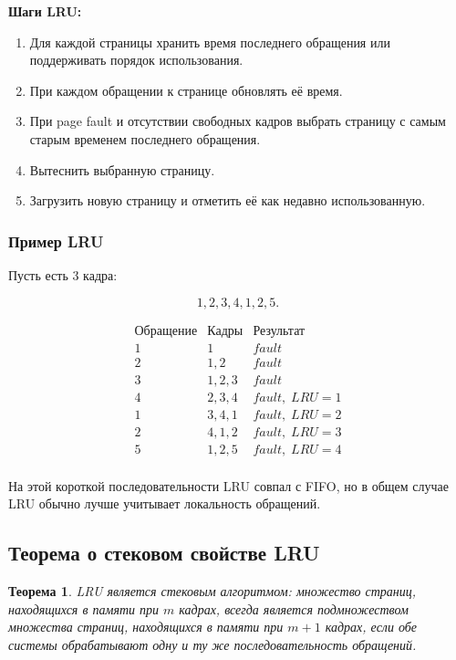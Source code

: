 \documentclass[a4paper,12pt]{article}
\newtheorem{theorem}{Теорема}
\begin{document}
\textbf{Шаги LRU:}

\begin{enumerate}
    \item Для каждой страницы хранить время последнего обращения или поддерживать порядок использования.
    \item При каждом обращении к странице обновлять её время.
    \item При page fault и отсутствии свободных кадров выбрать страницу с самым старым временем последнего обращения.
    \item Вытеснить выбранную страницу.
    \item Загрузить новую страницу и отметить её как недавно использованную.
\end{enumerate}

\subsubsection{Пример LRU}

Пусть есть 3 кадра:

\[
1,2,3,4,1,2,5.
\]

\[
\begin{array}{c|c|c}
\text{Обращение} & \text{Кадры} & \text{Результат} \\
\hline
1 & 1 & fault \\
2 & 1,2 & fault \\
3 & 1,2,3 & fault \\
4 & 2,3,4 & fault,\; LRU=1 \\
1 & 3,4,1 & fault,\; LRU=2 \\
2 & 4,1,2 & fault,\; LRU=3 \\
5 & 1,2,5 & fault,\; LRU=4 \\
\end{array}
\]

На этой короткой последовательности LRU совпал с FIFO, но в общем случае LRU обычно лучше учитывает локальность обращений.

\subsection{Теорема о стековом свойстве LRU}

\begin{theorem}
LRU является стековым алгоритмом: множество страниц, находящихся в памяти при $m$ кадрах, всегда является подмножеством множества страниц, находящихся в памяти при $m+1$ кадрах, если обе системы обрабатывают одну и ту же последовательность обращений.
\end{theorem}
\end{document}

